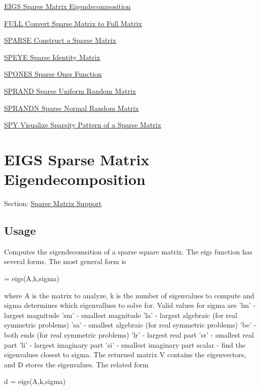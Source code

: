
\begin{DoxyItemize}
\item \hyperlink{sparse_eigs}{E\-I\-G\-S Sparse Matrix Eigendecomposition}  
\item \hyperlink{sparse_full}{F\-U\-L\-L Convert Sparse Matrix to Full Matrix}  
\item \hyperlink{sparse_sparse}{S\-P\-A\-R\-S\-E Construct a Sparse Matrix}  
\item \hyperlink{sparse_speye}{S\-P\-E\-Y\-E Sparse Identity Matrix}  
\item \hyperlink{sparse_spones}{S\-P\-O\-N\-E\-S Sparse Ones Function}  
\item \hyperlink{sparse_sprand}{S\-P\-R\-A\-N\-D Sparse Uniform Random Matrix}  
\item \hyperlink{sparse_sprandn}{S\-P\-R\-A\-N\-D\-N Sparse Normal Random Matrix}  
\item \hyperlink{sparse_spy}{S\-P\-Y Visualize Sparsity Pattern of a Sparse Matrix}  
\end{DoxyItemize}\hypertarget{sparse_eigs}{}\section{E\-I\-G\-S Sparse Matrix Eigendecomposition}\label{sparse_eigs}
Section\-: \hyperlink{sec_sparse}{Sparse Matrix Support} \hypertarget{vtkwidgets_vtkxyplotwidget_Usage}{}\subsection{Usage}\label{vtkwidgets_vtkxyplotwidget_Usage}
Computes the eigendecomsition of a sparse square matrix. The {\ttfamily eigs} function has several forms. The most general form is \begin{DoxyVerb}  [V,D] = eigs(A,k,sigma)
\end{DoxyVerb}
 where {\ttfamily A} is the matrix to analyze, {\ttfamily k} is the number of eigenvalues to compute and {\ttfamily sigma} determines which eigenvallues to solve for. Valid values for {\ttfamily sigma} are 'lm' -\/ largest magnitude 'sm' -\/ smallest magnitude 'la' -\/ largest algebraic (for real symmetric problems) 'sa' -\/ smallest algebraic (for real symmetric problems) 'be' -\/ both ends (for real symmetric problems) 'lr' -\/ largest real part 'sr' -\/ smallest real part 'li' -\/ largest imaginary part 'si' -\/ smallest imaginary part scalar -\/ find the eigenvalues closest to {\ttfamily sigma}. The returned matrix {\ttfamily V} contains the eigenvectors, and {\ttfamily D} stores the eigenvalues. The related form \begin{DoxyVerb}   d = eigs(A,k,sigma)
\end{DoxyVerb}
